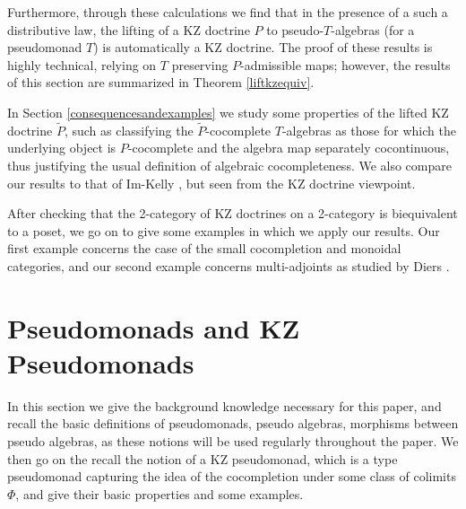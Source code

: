 \documentclass[a4paper,oneside,english]{amsart}
\numberwithin{equation}{section}
\numberwithin{figure}{section}
\theoremstyle{plain}
\theoremstyle{definition}
\theoremstyle{remark}
\theoremstyle{definition}
\theoremstyle{plain}
\theoremstyle{plain}
\theoremstyle{plain}
\begin{document}
Furthermore, through these calculations we find that in the presence
of a such a distributive law, the lifting of a KZ doctrine $P$ to
pseudo-$T$-algebras (for a pseudomonad $T$) is automatically a KZ
doctrine. The proof of these results is highly technical, relying
on $T$ preserving $P$-admissible maps; however, the results of this
section are summarized in Theorem \ref{liftkzequiv}. 

In Section \ref{consequencesandexamples} we study some properties
of the lifted KZ doctrine $\widetilde{P}$, such as classifying the
$\widetilde{P}$-cocomplete $T$-algebras as those for which the underlying
object is $P$-cocomplete and the algebra map separately cocontinuous,
thus justifying the usual definition of algebraic cocompleteness.
We also compare our results to that of Im-Kelly \cite{uniconvolution},
but seen from the KZ doctrine viewpoint.

After checking that the 2-category of KZ doctrines on a 2-category
is biequivalent to a poset, we go on to give some examples in which
we apply our results. Our first example concerns the case of the small
cocompletion and monoidal categories, and our second example concerns
multi-adjoints as studied by Diers \cite{diers}.

\section{Pseudomonads and KZ Pseudomonads\label{background}}

In this section we give the background knowledge necessary for this
paper, and recall the basic definitions of pseudomonads, pseudo algebras,
morphisms between pseudo algebras, as these notions will be used regularly
throughout the paper. We then go on the recall the notion of a KZ
pseudomonad, which is a type pseudomonad capturing the idea of the
cocompletion under some class of colimits $\Phi$, and give their
basic properties and some examples.
\end{document}
